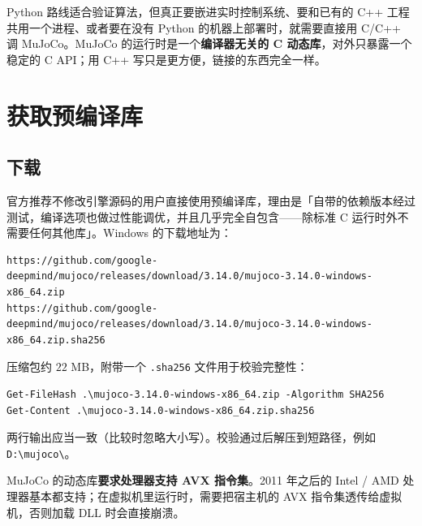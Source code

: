 
Python 路线适合验证算法，但真正要嵌进实时控制系统、要和已有的 C++ 工程共用一个进程、或者要在没有 Python 的机器上部署时，就需要直接用 C/C++ 调 MuJoCo。MuJoCo 的运行时是一个\textbf{编译器无关的 C 动态库}，对外只暴露一个稳定的 C API；用 C++ 写只是更方便，链接的东西完全一样。

\section{获取预编译库}

\subsection{下载}

官方推荐不修改引擎源码的用户直接使用预编译库，理由是「自带的依赖版本经过测试，编译选项也做过性能调优，并且几乎完全自包含——除标准 C 运行时外不需要任何其他库」。Windows 的下载地址为：

\begin{lstlisting}[style=shell]
https://github.com/google-deepmind/mujoco/releases/download/3.14.0/mujoco-3.14.0-windows-x86_64.zip
https://github.com/google-deepmind/mujoco/releases/download/3.14.0/mujoco-3.14.0-windows-x86_64.zip.sha256
\end{lstlisting}

压缩包约 $22$ MB，附带一个 \texttt{.sha256} 文件用于校验完整性：

\begin{lstlisting}[style=shell]
Get-FileHash .\mujoco-3.14.0-windows-x86_64.zip -Algorithm SHA256
Get-Content .\mujoco-3.14.0-windows-x86_64.zip.sha256
\end{lstlisting}

两行输出应当一致（比较时忽略大小写）。校验通过后解压到短路径，例如 \texttt{D:\textbackslash{}mujoco\textbackslash{}}。

\begin{warnbox}
	MuJoCo 的动态库\textbf{要求处理器支持 AVX 指令集}。2011 年之后的 Intel / AMD 处理器基本都支持；在虚拟机里运行时，需要把宿主机的 AVX 指令集透传给虚拟机，否则加载 DLL 时会直接崩溃。
\end{warnbox}

